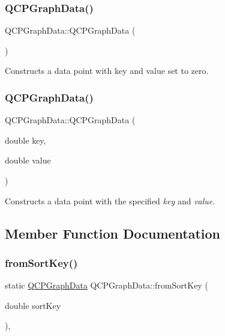 \subsubsection{\texorpdfstring{Q\+C\+P\+Graph\+Data()}{QCPGraphData()}\hspace{0.1cm}{\footnotesize\ttfamily [1/2]}}
{\footnotesize\ttfamily Q\+C\+P\+Graph\+Data\+::\+Q\+C\+P\+Graph\+Data (\begin{DoxyParamCaption}{ }\end{DoxyParamCaption})}

Constructs a data point with key and value set to zero. \mbox{\label{class_q_c_p_graph_data_a2c32177f12f902f4e05f712837082bd6}} 
\subsubsection{\texorpdfstring{Q\+C\+P\+Graph\+Data()}{QCPGraphData()}\hspace{0.1cm}{\footnotesize\ttfamily [2/2]}}
{\footnotesize\ttfamily Q\+C\+P\+Graph\+Data\+::\+Q\+C\+P\+Graph\+Data (\begin{DoxyParamCaption}\item[{double}]{key,  }\item[{double}]{value }\end{DoxyParamCaption})}

Constructs a data point with the specified {\itshape key} and {\itshape value}. 

\subsection{Member Function Documentation}
\mbox{\label{class_q_c_p_graph_data_a4646eac7f7a48970ea0fc5153aab0e77}} 
\subsubsection{\texorpdfstring{from\+Sort\+Key()}{fromSortKey()}}
{\footnotesize\ttfamily static \mbox{\hyperlink{class_q_c_p_graph_data}{Q\+C\+P\+Graph\+Data}} Q\+C\+P\+Graph\+Data\+::from\+Sort\+Key (\begin{DoxyParamCaption}\item[{double}]{sort\+Key }\end{DoxyParamCaption})\hspace{0.3cm}{\ttfamily [inline]}, {\ttfamily [static]}}

